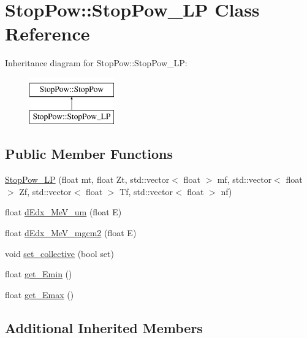 \hypertarget{class_stop_pow_1_1_stop_pow___l_p}{\section{Stop\-Pow\-:\-:Stop\-Pow\-\_\-\-L\-P Class Reference}
\label{class_stop_pow_1_1_stop_pow___l_p}
}
Inheritance diagram for Stop\-Pow\-:\-:Stop\-Pow\-\_\-\-L\-P\-:\begin{figure}[H]
\begin{center}
\leavevmode
\includegraphics[height=2.000000cm]{class_stop_pow_1_1_stop_pow___l_p}
\end{center}
\end{figure}
\subsection*{Public Member Functions}
\begin{DoxyCompactItemize}
\item 
\hyperlink{class_stop_pow_1_1_stop_pow___l_p_a98c19537a4e112bbd9d062fbfedabf97}{Stop\-Pow\-\_\-\-L\-P} (float mt, float Zt, std\-::vector$<$ float $>$ mf, std\-::vector$<$ float $>$ Zf, std\-::vector$<$ float $>$ Tf, std\-::vector$<$ float $>$ nf)
\item 
float \hyperlink{class_stop_pow_1_1_stop_pow___l_p_af46e3156b2f8ef219649201f0bdd1d1a}{d\-Edx\-\_\-\-Me\-V\-\_\-um} (float E)
\item 
float \hyperlink{class_stop_pow_1_1_stop_pow___l_p_a619b9737b0e2139410c1df6e65781a3b}{d\-Edx\-\_\-\-Me\-V\-\_\-mgcm2} (float E)
\item 
void \hyperlink{class_stop_pow_1_1_stop_pow___l_p_adac0e31284a7a2578f74c671fd0f976a}{set\-\_\-collective} (bool set)
\item 
float \hyperlink{class_stop_pow_1_1_stop_pow___l_p_a810b738fd1addec164711d712865a030}{get\-\_\-\-Emin} ()
\item 
float \hyperlink{class_stop_pow_1_1_stop_pow___l_p_af665f7606e35db7c0c696dda07e2e623}{get\-\_\-\-Emax} ()
\end{DoxyCompactItemize}
\subsection*{Additional Inherited Members}


